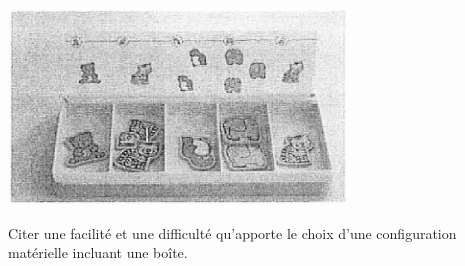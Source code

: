 \begin{exercice}[CRPE 2016 G1]
\begin{enumerate}
\begin{center}
      \includegraphics[width=9cm]{Nombres_et_calculs_did/Images/Num1_analyse_boite5}
   \end{center}       
   Citer une facilité et une difficulté qu'apporte le choix d'une configuration matérielle incluant une boîte.
\end{enumerate}
\end{exercice}

